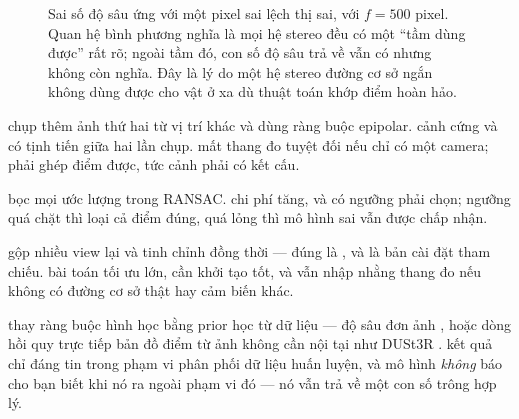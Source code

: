 \documentclass[../../../deep_learning.tex]{subfiles}
\begin{document}
\begin{figure}[H]\centering
{}
\caption{Sai số độ sâu ứng với một pixel sai lệch thị sai, với \(f=500\) pixel. Quan hệ bình phương nghĩa là mọi hệ stereo đều có một ``tầm dùng được'' rất rõ; ngoài tầm đó, con số độ sâu trả về vẫn có nhưng không còn nghĩa. Đây là lý do một hệ stereo đường cơ sở ngắn không dùng được cho vật ở xa dù thuật toán khớp điểm hoàn hảo.}
\label{fig:sai-so-do-sau}
\end{figure}

\begin{mach}
\item {} \gp chụp thêm ảnh thứ hai từ vị trí khác và dùng ràng buộc epipolar. \gd cảnh cứng và có tịnh tiến giữa hai lần chụp. \gia mất thang đo tuyệt đối nếu chỉ có một camera; phải ghép điểm được, tức cảnh phải có kết cấu.
\item {} \gp bọc mọi ước lượng trong RANSAC. \gia chi phí tăng, và có ngưỡng phải chọn; ngưỡng quá chặt thì loại cả điểm đúng, quá lỏng thì mô hình sai vẫn được chấp nhận.
\item {} \gp gộp nhiều view lại và tinh chỉnh đồng thời --- đúng là , và  \cite{schoenberger2016colmap} là bản cài đặt tham chiếu. \gia bài toán tối ưu lớn, cần khởi tạo tốt, và vẫn nhập nhằng thang đo nếu không có đường cơ sở thật hay cảm biến khác.
\item {} \gp thay ràng buộc hình học bằng prior học từ dữ liệu --- độ sâu đơn ảnh \cite{ranftl2022midas}, hoặc dòng hồi quy trực tiếp bản đồ điểm từ ảnh không cần nội tại như DUSt3R \cite{wang2024dust3r}. \gia kết quả chỉ đáng tin trong phạm vi phân phối dữ liệu huấn luyện, và mô hình \emph{không} báo cho bạn biết khi nó ra ngoài phạm vi đó --- nó vẫn trả về một con số trông hợp lý.
\end{mach}
\end{document}
